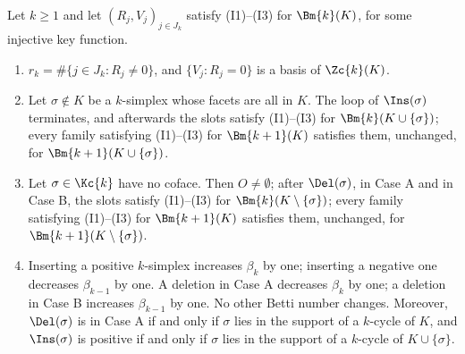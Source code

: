 \begin{theorem}[Exactness]\label{thm:exact}
Let $k\ge1$ and let $(R_j,V_j)_{j\in J_k}$ satisfy (I1)--(I3) for $\Bm{k}(K)$,
for some injective key function.
\begin{enumerate}
\item[(a)] $r_k=\#\{j\in J_k : R_j\ne0\}$, and $\{V_j : R_j=0\}$ is a basis of
  $\Zc{k}(K)$.
\item[(b)] Let $\sigma\notin K$ be a $k$-simplex whose facets are all in $K$.
  The loop of $\Ins(\sigma)$
  terminates, and afterwards the slots satisfy (I1)--(I3) for
  $\Bm{k}(K\cup\{\sigma\})$; every family satisfying (I1)--(I3) for
  $\Bm{k+1}(K)$ satisfies them, unchanged, for $\Bm{k+1}(K\cup\{\sigma\})$.
\item[(c)] Let $\sigma\in\Kc{k}$ have no coface. Then $O\ne\emptyset$; after
  $\Del(\sigma)$, in Case A and in Case B, the slots satisfy (I1)--(I3) for
  $\Bm{k}(K\setminus\{\sigma\})$; every family satisfying (I1)--(I3) for
  $\Bm{k+1}(K)$ satisfies them, unchanged, for $\Bm{k+1}(K\setminus\{\sigma\})$.
\item[(d)] Inserting a positive $k$-simplex increases $\beta_k$ by one; inserting
  a negative one decreases $\beta_{k-1}$ by one. A deletion in Case A decreases
  $\beta_k$ by one; a deletion in Case B increases $\beta_{k-1}$ by one. No
  other Betti number changes. Moreover, $\Del(\sigma)$ is in Case A if and only
  if $\sigma$ lies in the support of a $k$-cycle of $K$, and $\Ins(\sigma)$ is
  positive if and only if $\sigma$ lies in the support of a $k$-cycle of
  $K\cup\{\sigma\}$.
\end{enumerate}
\end{theorem}

